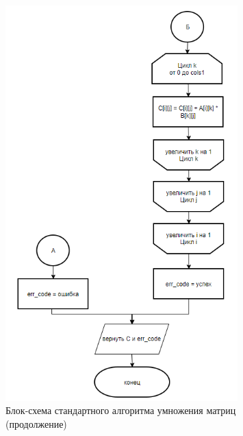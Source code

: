 \begin{figure}[H]
    \centering
    \includegraphics[width=0.8\textwidth]{img/block_1_2.png}
    \caption{Блок-схема стандартного алгоритма умножения матриц (продолжение)}
    \label{fig:block_1_2}
\end{figure}

